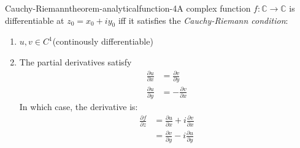\begin{mystthmtheorem}{Cauchy-Riemann}{theorem-analyticalfunction-4}A complex function $f:\mathbb{C} \to \mathbb{C}$ is differentiable at $z_0=x_0+iy_0$ iff it satisfies the \textit{Cauchy-Riemann condition}:

\begin{enumerate}
\item $u,v\in C^1$(continously differentiable)
\item The partial derivatives satisfy
\begin{equation}
\begin{aligned}
\frac{\partial u}{\partial x} &= \frac{\partial v}{\partial y} \\
\frac{\partial u}{\partial y} &= -\frac{\partial v}{\partial x}
\end{aligned}
\end{equation}
In which case, the derivative is:
\begin{equation}
\begin{aligned}
\frac{\partial f}{\partial z} &= \frac{\partial u}{\partial x} + i \frac{\partial v}{\partial x} \\
&= \frac{\partial v}{\partial y} - i \frac{\partial u}{\partial y}
\end{aligned}
\end{equation}
\end{enumerate}

\end{mystthmtheorem}
